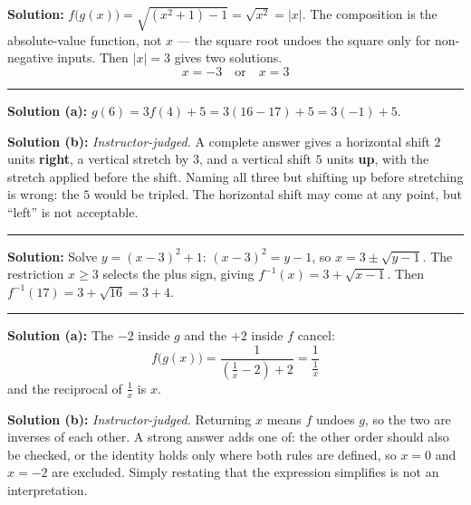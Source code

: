 \documentclass[12pt]{article}
\begin{document}

\textbf{Solution:} $f\bigl(g(x)\bigr) = \sqrt{\left(x^{2} + 1\right) - 1} = \sqrt{x^{2}} = |x|$. The composition is the absolute-value function, not $x$ --- the square root undoes the square only for non-negative inputs. Then $|x| = 3$ gives two solutions.
\[ \boxed{x = -3 \quad \text{or} \quad x = 3} \]

\vspace{0.1cm}\noindent\rule{\linewidth}{0.2pt}


\textbf{Solution (a):} $g(6) = 3f(4) + 5 = 3\left(16 - 17\right) + 5 = 3(-1) + 5$. 

\textbf{Solution (b):} \emph{Instructor-judged.} A complete answer gives a horizontal shift $2$ units \textbf{right}, a vertical stretch by $3$, and a vertical shift $5$ units \textbf{up}, with the stretch applied before the shift. Naming all three but shifting up before stretching is wrong: the $5$ would be tripled. The horizontal shift may come at any point, but ``left'' is not acceptable.

\vspace{0.1cm}\noindent\rule{\linewidth}{0.2pt}


\textbf{Solution:} Solve $y = (x-3)^{2} + 1$: $(x-3)^{2} = y - 1$, so $x = 3 \pm \sqrt{y-1}$. The restriction $x \geq 3$ selects the plus sign, giving $f^{-1}(x) = 3 + \sqrt{x-1}$. Then $f^{-1}(17) = 3 + \sqrt{16} = 3 + 4$. 

\vspace{0.1cm}\noindent\rule{\linewidth}{0.2pt}


\textbf{Solution (a):} The $-2$ inside $g$ and the $+2$ inside $f$ cancel:
\[ f\bigl(g(x)\bigr) = \frac{1}{\left(\tfrac{1}{x} - 2\right) + 2} = \frac{1}{\tfrac{1}{x}} \]
and the reciprocal of $\tfrac{1}{x}$ is $x$. 

\textbf{Solution (b):} \emph{Instructor-judged.} Returning $x$ means $f$ undoes $g$, so the two are inverses of each other. A strong answer adds one of: the other order should also be checked, or the identity holds only where both rules are defined, so $x = 0$ and $x = -2$ are excluded. Simply restating that the expression simplifies is not an interpretation.
\end{document}
